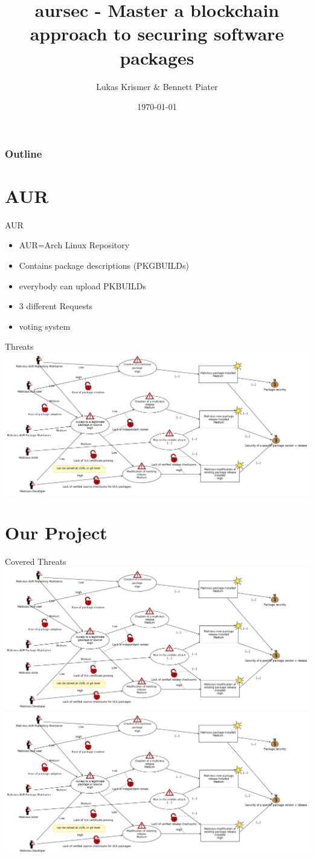 \documentclass{beamer}
\title{aursec - Master a blockchain approach to securing software packages}
\author{Lukas Krismer \& Bennett Piater}
\institute{Universität Innsbruck - QE - Christian Sillaber}
\date{\today}
\begin{document}
\maketitle


\begin{frame}
	\frametitle{Outline}
	\tableofcontents
\end{frame}

\section{AUR}

\begin{frame}{AUR}
\begin{itemize}
	\item AUR=Arch Linux Repository
	\item Contains package descriptions (PKGBUILDs)
	\item everybody can upload PKBUILDs
	\item 3 different Requests
	\item voting system
\end{itemize}
\end{frame}

\begin{frame}{Threats}
\includegraphics[width=\textwidth]{threat.png}
\end{frame}

\section{Our Project}

\begin{frame}{Covered Threats}
\includegraphics<1>[width=\textwidth]{threat.png}
\includegraphics<2>[width=\textwidth]{threat.png} %
\end{frame}
\end{document}

